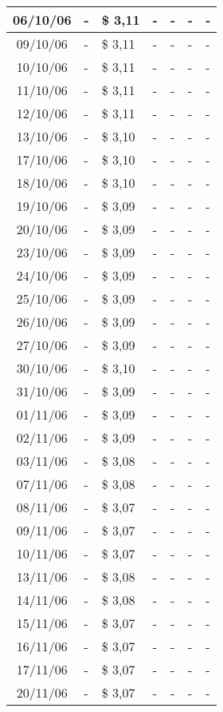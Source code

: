 \begin{center}
\begin{longtable}{|c|p{1.5cm}|p{1.5cm}|p{1.5cm}|p{1.5cm}|p{1.5cm}|p{1.5cm}|}
06/10/06 & - & \$ 3,11 & - & - & - & - \\ \hline
09/10/06 & - & \$ 3,11 & - & - & - & - \\ \hline
10/10/06 & - & \$ 3,11 & - & - & - & - \\ \hline
11/10/06 & - & \$ 3,11 & - & - & - & - \\ \hline
12/10/06 & - & \$ 3,11 & - & - & - & - \\ \hline
13/10/06 & - & \$ 3,10 & - & - & - & - \\ \hline
17/10/06 & - & \$ 3,10 & - & - & - & - \\ \hline
18/10/06 & - & \$ 3,10 & - & - & - & - \\ \hline
19/10/06 & - & \$ 3,09 & - & - & - & - \\ \hline
20/10/06 & - & \$ 3,09 & - & - & - & - \\ \hline
23/10/06 & - & \$ 3,09 & - & - & - & - \\ \hline
24/10/06 & - & \$ 3,09 & - & - & - & - \\ \hline
25/10/06 & - & \$ 3,09 & - & - & - & - \\ \hline
26/10/06 & - & \$ 3,09 & - & - & - & - \\ \hline
27/10/06 & - & \$ 3,09 & - & - & - & - \\ \hline
30/10/06 & - & \$ 3,10 & - & - & - & - \\ \hline
31/10/06 & - & \$ 3,09 & - & - & - & - \\ \hline
01/11/06 & - & \$ 3,09 & - & - & - & - \\ \hline
02/11/06 & - & \$ 3,09 & - & - & - & - \\ \hline
03/11/06 & - & \$ 3,08 & - & - & - & - \\ \hline
07/11/06 & - & \$ 3,08 & - & - & - & - \\ \hline
08/11/06 & - & \$ 3,07 & - & - & - & - \\ \hline
09/11/06 & - & \$ 3,07 & - & - & - & - \\ \hline
10/11/06 & - & \$ 3,07 & - & - & - & - \\ \hline
13/11/06 & - & \$ 3,08 & - & - & - & - \\ \hline
14/11/06 & - & \$ 3,08 & - & - & - & - \\ \hline
15/11/06 & - & \$ 3,07 & - & - & - & - \\ \hline
16/11/06 & - & \$ 3,07 & - & - & - & - \\ \hline
17/11/06 & - & \$ 3,07 & - & - & - & - \\ \hline
20/11/06 & - & \$ 3,07 & - & - & - & - \\ \hline

\end{longtable}
\end{center}
